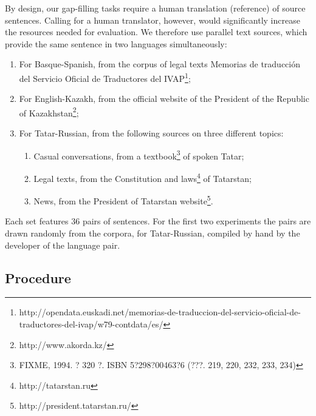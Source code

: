 \documentclass[11pt]{article}
\newcommand{\comment}[1]{\marginpar{\scriptsize\sf \textcolor{blue}{#1}}}
\begin{document}
\comment{EA: maybe I should put this into the previous section?}
By design, our gap-filling tasks require a human translation (reference) of source sentences. Calling for a human translator, however, would significantly increase the resources needed for evaluation. We therefore use parallel text sources, which provide the same sentence in two languages simultaneously:
\begin{enumerate}
\item  For Basque-Spanish, from the corpus of legal texts Memorias de traducci\'on del
Servicio Oficial de Traductores del IVAP\footnote{http://opendata.euskadi.net/memorias-de-traduccion-del-servicio-oficial-de-traductores-del-ivap/w79-contdata/es/};
\item  For English-Kazakh, from the official website of the President of the Republic of
Kazakhstan\footnote{http://www.akorda.kz/};
\item  For Tatar-Russian, from the following sources on three different topics:
  \begin{enumerate}
\comment{EA: whoops, what is the best way to make it understand cyrillic?}
    \item  Casual conversations, from a textbook\footnote{FIXME, 1994. ? 320 ?. ISBN 5?298?00463?6 (???. 219, 220, 232, 233, 234)} of spoken Tatar;
    \item  Legal texts, from the Constitution and laws\footnote{http://tatarstan.ru} of Tatarstan;
    \item  News, from the President of Tatarstan website\footnote{http://president.tatarstan.ru/}.
  \end{enumerate}
\end{enumerate}

Each set features 36 pairs of sentences. For the first two experiments the pairs are drawn
randomly from the corpora, for Tatar-Russian, compiled by hand by the developer of the
language pair.

\subsection{Procedure}
\end{document}
